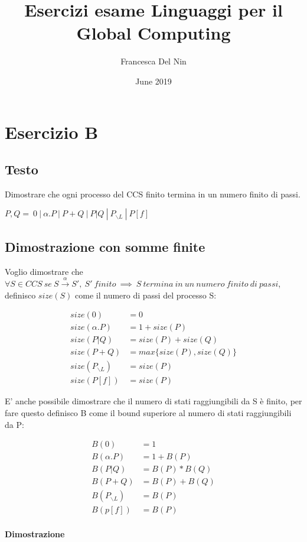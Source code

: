 \documentclass{article}
\title{Esercizi esame Linguaggi per il Global Computing}
\author{Francesca Del Nin}
\date{June 2019}
\newcommand{\pl}{P_{\backslash L}}
\begin{document}
\maketitle

\section{Esercizio B}
\subsection{Testo}

Dimostrare che ogni processo del CCS finito termina in un numero finito di passi.
\begin{center}
    $P, Q = ~0 ~|~ \alpha .P~|~ P+Q~|~ P|Q ~ | ~P_{\backslash L}~|~P[f] $
\end{center}

\subsection{Dimostrazione con somme finite}
Voglio dimostrare che  $\forall S \in CCS~  se ~ S \xrightarrow{\alpha}  S', ~S'~  finito ~ \implies  ~ S ~ termina~  in~  un~  numero~  finito ~ di~  passi$, definisco $size(S)$ come il numero di passi del processo S:

\begin{align*}
size(0) &= 0 \\
size(\alpha.P) &= 1+size(P)\\
size(P|Q) &= size(P)+size(Q)\\
size(P+Q) &= max\{size(P), size(Q)\}\\
size(P_{\backslash L}) &= size(P)\\
size(P[f]) &= size(P)
\end{align*}

E' anche possibile dimostrare che il numero di stati raggiungibili da S è finito, per fare questo definisco B come il bound superiore al numero di stati raggiungibili da P:

\begin{align*}
B(0) &= 1\\
B(\alpha.P) &= 1 + B(P)\\
B(P|Q) &= B(P) * B(Q)\\
B(P+Q) &= B(P) + B(Q)\\
B(\pl) &=  B(P)\\
B(p[f]) &=  B(P)
\end{align*}

\paragraph{Dimostrazione} %
\end{document}
